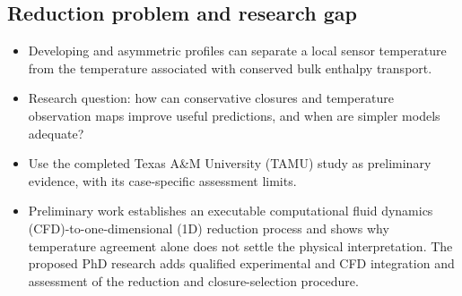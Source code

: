 \subsection{Reduction problem and research gap}\label{subsec:reduction-problem-and-research-gap}
\begin{itemize}[leftmargin=*]
\item Developing and asymmetric profiles can separate a local sensor temperature from the temperature associated with conserved bulk enthalpy transport.
\item Research question: how can conservative closures and temperature observation maps improve useful predictions, and when are simpler models adequate?
\item Use the completed Texas A\&M University (TAMU) study as preliminary evidence, with its case-specific assessment limits.\cite{fierro2026cfdoneD,reis2024molten}
\item Preliminary work establishes an executable computational fluid dynamics (CFD)-to-one-dimensional (1D) reduction process and shows why temperature agreement alone does not settle the physical interpretation. The proposed PhD research adds qualified experimental and CFD integration and assessment of the reduction and closure-selection procedure.\cite{fierro2026cfdoneD}
\end{itemize}
